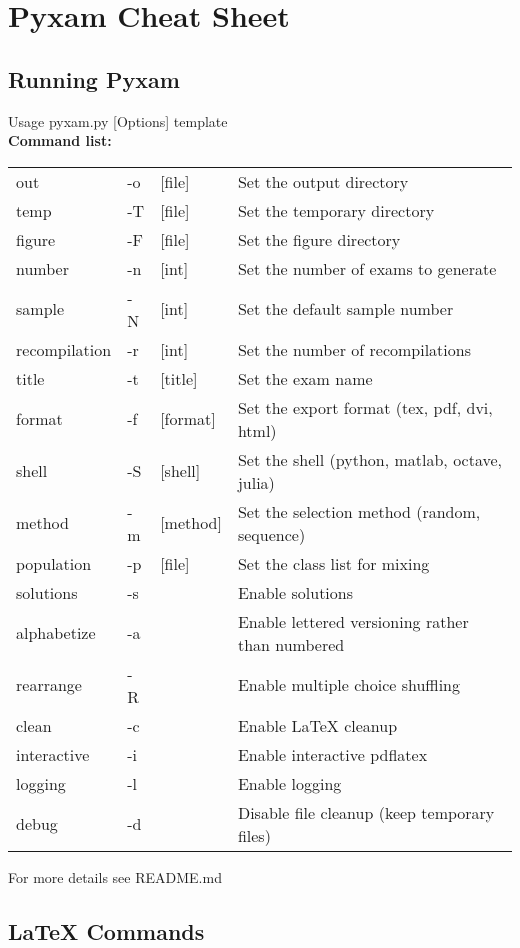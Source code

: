 \documentclass[9pt]{extarticle}
\begin{document}
\centering\section*{Pyxam Cheat Sheet}
\begin{multicols}{2}
\raggedright\subsection*{Running Pyxam}
Usage pyxam.py [Options] template \\
{\bf Command list:} \\
\begin{tabular}{l l l l}
  out & -o  & [file] & Set the output directory \\ 
  temp & -T & [file] & Set the temporary directory \\
  figure & -F & [file] & Set the figure directory \\
  number & -n & [int] & Set the number of exams to generate \\
  sample & -N & [int] & Set the default sample number \\
  recompilation & -r & [int] & Set the number of recompilations \\
  title & -t & [title] & Set the exam name \\
  format & -f & [format] & Set the export format (tex, pdf, dvi, html) \\
  shell & -S & [shell] & Set the shell (python, matlab, octave, julia) \\
  method & -m & [method] & Set the selection method (random, sequence) \\
  population & -p & [file] & Set the class list for mixing \\
  solutions & -s & & Enable solutions \\
  alphabetize & -a & & Enable lettered versioning rather than numbered \\
  rearrange & -R & & Enable multiple choice shuffling \\
  clean & -c & & Enable LaTeX cleanup \\
  interactive & -i & & Enable interactive pdflatex \\
  logging & -l & & Enable logging \\
  debug & -d & & Disable file cleanup (keep temporary files) \\
\end{tabular} 

For more details see README.md \\
\subsection*{LaTeX Commands}


\end{multicols}
\end{document}
